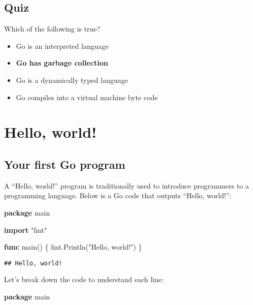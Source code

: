 \documentclass[]{book}
\newenvironment{Shaded}{\begin{snugshade}}{\end{snugshade}}
\newcommand{\KeywordTok}[1]{\textcolor[rgb]{0.13,0.29,0.53}{\textbf{#1}}}
\newcommand{\NormalTok}[1]{#1}
\newcommand{\StringTok}[1]{\textcolor[rgb]{0.31,0.60,0.02}{#1}}
\providecommand{\tightlist}{%
  \setlength{\itemsep}{0pt}\setlength{\parskip}{0pt}}
\begin{document}
\hypertarget{quiz-1}{%
\subsection{Quiz}\label{quiz-1}}

Which of the following is true?

\begin{itemize}
\tightlist
\item
  Go is an interpreted language
\item
  \textbf{Go has garbage collection}
\item
  Go is a dynamically typed language
\item
  Go compiles into a virtual machine byte code
\end{itemize}

\hypertarget{hello-world}{%
\section{Hello, world!}\label{hello-world}}

\hypertarget{your-first-go-program}{%
\subsection{Your first Go program}\label{your-first-go-program}}

A ``Hello, world!'' program is traditionally used to introduce programmers to a
programming language. Below is a Go code that outputs ``Hello, world!'':

\begin{Shaded}
\begin{Highlighting}[]
\KeywordTok{package}\NormalTok{ main}

\KeywordTok{import} \StringTok{"fmt"}

\KeywordTok{func}\NormalTok{ main() \{}
\NormalTok{    fmt.Println(}\StringTok{"Hello, world!"}\NormalTok{)}
\NormalTok{\}}
\end{Highlighting}
\end{Shaded}

\begin{verbatim}
## Hello, world!
\end{verbatim}

Let's break down the code to understand each line:

\begin{Shaded}
\begin{Highlighting}[]
\KeywordTok{package}\NormalTok{ main}
\end{Highlighting}
\end{Shaded}
\end{document}
